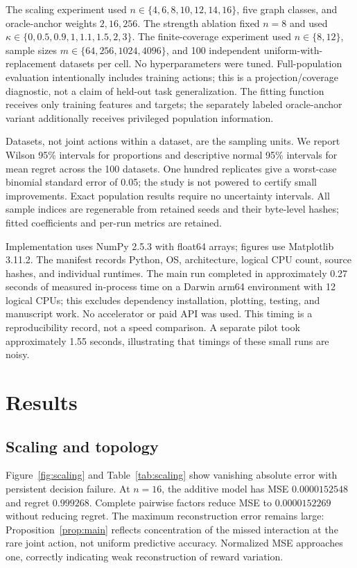 \documentclass[10pt]{article}
\begin{document}
The scaling experiment used $n\in\{4,6,8,10,12,14,16\}$, five graph classes, and oracle-anchor weights $2,16,256$. The strength ablation fixed $n=8$ and used $\kappa\in\{0,0.5,0.9,1,1.1,1.5,2,3\}$. The finite-coverage experiment used $n\in\{8,12\}$, sample sizes $m\in\{64,256,1024,4096\}$, and 100 independent uniform-with-replacement datasets per cell. No hyperparameters were tuned. Full-population evaluation intentionally includes training actions; this is a projection/coverage diagnostic, not a claim of held-out task generalization. The fitting function receives only training features and targets; the separately labeled oracle-anchor variant additionally receives privileged population information.

Datasets, not joint actions within a dataset, are the sampling units. We report Wilson 95\% intervals for proportions and descriptive normal 95\% intervals for mean regret across the 100 datasets. One hundred replicates give a worst-case binomial standard error of 0.05; the study is not powered to certify small improvements. Exact population results require no uncertainty intervals. All sample indices are regenerable from retained seeds and their byte-level hashes; fitted coefficients and per-run metrics are retained.

Implementation uses NumPy 2.5.3 with float64 arrays; figures use Matplotlib 3.11.2. The manifest records Python, OS, architecture, logical CPU count, source hashes, and individual runtimes. The main run completed in approximately 0.27 seconds of measured in-process time on a Darwin arm64 environment with 12 logical CPUs; this excludes dependency installation, plotting, testing, and manuscript work. No accelerator or paid API was used. This timing is a reproducibility record, not a speed comparison. A separate pilot took approximately 1.55 seconds, illustrating that timings of these small runs are noisy.

\section{Results}
\subsection{Scaling and topology}
Figure~\ref{fig:scaling} and Table~\ref{tab:scaling} show vanishing absolute error with persistent decision failure. At $n=16$, the additive model has MSE $0.0000152548$ and regret $0.999268$. Complete pairwise factors reduce MSE to $0.0000152269$ without reducing regret. The maximum reconstruction error remains large: Proposition~\ref{prop:main} reflects concentration of the missed interaction at the rare joint action, not uniform predictive accuracy. Normalized MSE approaches one, correctly indicating weak reconstruction of reward variation.
\end{document}

